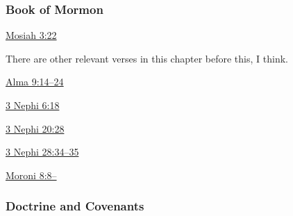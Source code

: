 		
	\subsubsection{Book of Mormon} %
		\label{ACCOUNTABILITY-BOM}
	
		
		\begin{compactdesc}
			\item[{\hyperref[MOSIAH-3-22]{Mosiah 3:22}}] \phantom{.}
				\begin{compactitem}
					\item There are other relevant verses in this chapter before this, I think.
				\end{compactitem}
			\item[{\hyperref[ALMA-9-14]{Alma 9:14--24}}]
			\item[{\hyperref[3NEPHI-6-18]{3 Nephi 6:18}}]
			\item[{\hyperref[3NEPHI-20-28]{3 Nephi 20:28}}]
			\item[{\hyperref[3NEPHI-28-34]{3 Nephi 28:34--35}}]
			\item[{\hyperref[MORONI-8-8]{Moroni 8:8--}}]
		\end{compactdesc}
		
	\subsubsection{Doctrine and Covenants} %
		\label{ACCOUNTABILITY-DC}
	
		
